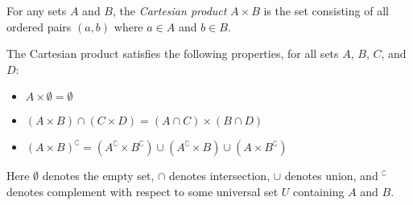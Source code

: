 \documentclass[12pt]{article}
\begin{document}
For any sets $A$ and $B$, the {\em Cartesian product} $A \times B$ is the set consisting of all ordered pairs $(a,b)$ where $a \in A$ and $b \in B$.

The Cartesian product satisfies the following properties, for all sets $A$, $B$, $C$, and $D$:
\begin{itemize}
\item $A\times \emptyset = \emptyset$
\item $(A \times B) \cap (C \times D) = (A\cap C) \times (B\cap D)$
\item $(A \times B)^\complement = (A^\complement \times B^\complement)
 \cup (A^\complement \times B)
 \cup (A \times B^\complement)$
\end{itemize}

Here $\emptyset$ denotes the empty set, $\cap$ denotes intersection, $\cup$ denotes union, and ${}^\complement$ denotes complement with respect to some universal set $U$ containing $A$ and $B$.
\end{document}
